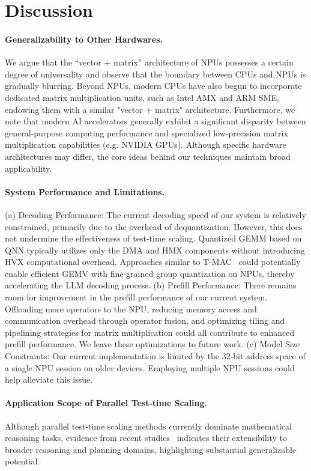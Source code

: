 \section{Discussion}

\paragraph{Generalizability to Other Hardwares.} We argue that the “vector + matrix” architecture of NPUs possesses a certain degree of universality and observe that the boundary between CPUs and NPUs is gradually blurring. Beyond NPUs, modern CPUs have also begun to incorporate dedicated matrix multiplication units, such as Intel AMX and ARM SME, endowing them with a similar "vector + matrix" architecture. Furthermore, we note that modern AI accelerators generally exhibit a significant disparity between general-purpose computing performance and specialized low-precision matrix multiplication capabilities (e.g. NVIDIA GPUs). Although specific hardware architectures may differ, the core ideas behind our techniques maintain broad applicability.

\paragraph{System Performance and Limitations.} (a) Decoding Performance: The current decoding speed of our system is relatively constrained, primarily due to the overhead of dequantization. However, this does not undermine the effectiveness of test-time scaling. Quantized GEMM based on QNN typically utilizes only the DMA and HMX components without introducing HVX computational overhead. Approaches similar to T-MAC~\cite{tmac} could potentially enable efficient GEMV with fine-grained group quantization on NPUs, thereby accelerating the LLM decoding process. (b) Prefill Performance: There remains room for improvement in the prefill performance of our current system. Offloading more operators to the NPU, reducing memory access and communication overhead through operator fusion, and optimizing tiling and pipelining strategies for matrix multiplication could all contribute to enhanced prefill performance. We leave these optimizations to future work. (c) Model Size Constraints: Our current implementation is limited by the 32-bit address space of a single NPU session on older devices. Employing multiple NPU sessions could help alleviate this issue.

\paragraph{Application Scope of Parallel Test-time Scaling.} Although parallel test-time scaling methods currently dominate mathematical reasoning tasks, evidence from recent studies~\cite{yan2025empowering,tot,paranjape2023boosting,hong2023metagpt,hafner2024reasoning,parallel-scaling-law} indicates their extensibility to broader reasoning and planning domains, highlighting substantial generalizable potential.
